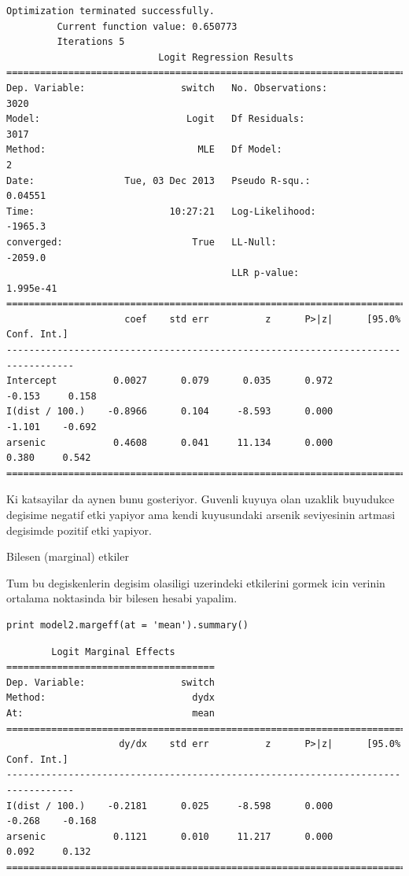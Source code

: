 \documentclass[12pt,fleqn]{article}\usepackage{../common}
\begin{document}
\begin{verbatim}
Optimization terminated successfully.
         Current function value: 0.650773
         Iterations 5
                           Logit Regression Results                           
==============================================================================
Dep. Variable:                 switch   No. Observations:                 3020
Model:                          Logit   Df Residuals:                     3017
Method:                           MLE   Df Model:                            2
Date:                Tue, 03 Dec 2013   Pseudo R-squ.:                 0.04551
Time:                        10:27:21   Log-Likelihood:                -1965.3
converged:                       True   LL-Null:                       -2059.0
                                        LLR p-value:                 1.995e-41
==================================================================================
                     coef    std err          z      P>|z|      [95.0% Conf. Int.]
----------------------------------------------------------------------------------
Intercept          0.0027      0.079      0.035      0.972        -0.153     0.158
I(dist / 100.)    -0.8966      0.104     -8.593      0.000        -1.101    -0.692
arsenic            0.4608      0.041     11.134      0.000         0.380     0.542
==================================================================================
\end{verbatim}

Ki katsayilar da aynen bunu gosteriyor. Guvenli kuyuya olan uzaklik buyudukce
degisime negatif etki yapiyor ama kendi kuyusundaki arsenik seviyesinin artmasi
degisimde pozitif etki yapiyor.

Bilesen (marginal) etkiler

Tum bu degiskenlerin degisim olasiligi uzerindeki etkilerini gormek icin
verinin ortalama noktasinda bir bilesen hesabi yapalim. 

\begin{verbatim}
print model2.margeff(at = 'mean').summary()
\end{verbatim}

\begin{verbatim}
        Logit Marginal Effects       
=====================================
Dep. Variable:                 switch
Method:                          dydx
At:                              mean
==================================================================================
                    dy/dx    std err          z      P>|z|      [95.0% Conf. Int.]
----------------------------------------------------------------------------------
I(dist / 100.)    -0.2181      0.025     -8.598      0.000        -0.268    -0.168
arsenic            0.1121      0.010     11.217      0.000         0.092     0.132
==================================================================================
\end{verbatim}
\end{document}
